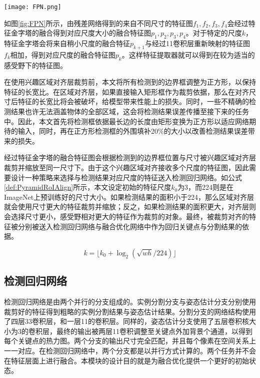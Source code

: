 \begin{figure*}[htbp]	
	\centering
	\texttt{[image: FPN.png]}
	\caption{特征金字塔结构：左侧为特征金字塔中特征融合的方式；右侧为融合结构设计。}
	\label{fig:FPN}
\end{figure*}

如图\ref{fig:FPN}所示，由残差网络得到的来自不同尺寸的特征图$f_1, f_2, f_3, f_4$会经过特征金字塔的融合得到对应尺度大小的融合特征图$p_1, p_2, p_3, p_4$。对于特定的尺度$k$，特征金字塔会将来自稍小尺度的融合特征$p_{k+1}$与经过1\times1卷积层重新映射的特征图$f_k$相加，得到对应尺度的融合特征图$p_k$。这样特征提取器就可以得到在较为适当的感受野下的特征图。

在使用兴趣区域对齐层裁剪前，本文将所有检测到的边界框调整为正方形，以保持特征的长宽比。在区域对齐层，如果直接输入矩形框作为裁剪依据，那么在对齐尺寸后特征的长宽比将会被破坏，给模型带来性能上的损失。同时，一些不精确的检测结果也许无法涵盖物体的全部区域，这会将检测结果误差传播至接下来的任务中。因此，本文首先将检测框依据最长边的长度由矩形变换为正方形以适应网络期待的输入，同时，再在正方形检测框的外围填补20\%的大小以改善检测结果误差带来的损失。

经过特征金字塔的融合特征图会根据检测到的边界框位置与尺寸被兴趣区域对齐层裁剪并缩放至同一尺寸下。由于这个兴趣区域对齐接收多个尺度的特征图，因此需要设计一种策略来选择与检测结果对应尺度的特征送入检测回归网络。如公式\eqref{def:PyramidRoIAlign}所示，本文设定初始的特征尺度$k_0$为3，而224则是在ImageNet上预训练好的尺寸大小。如果检测结果的面积小于224，那么区域对齐层就会使用尺寸更大的特征裁剪并缩放；反之，如果检测结果的面积更大，对齐层则会选择尺寸更小，感受野相对更大的特征作为裁剪的对象。最终，被裁剪对齐的特征被分别被送入检测回归网络与融合优化网络中作为回归关键点与分割结果的依据。

\begin{equation}
\label{def:PyramidRoIAlign}
k =\lfloor k_0 + \log_{2}(\sqrt{wh} / 224) \rfloor
\end{equation}

\subsection{检测回归网络}
\label{subsec:detection}
检测回归网络是由两个并行的分支组成的。实例分割分支与姿态估计分支分别使用裁剪好的特征得到粗略的实例分割结果与姿态估计结果。分割分支的网络结构使用了四层3\times3卷积层，和一层1\times1的卷积层。同样的，姿态估计分支使用了五层卷积核大小为3的卷积层，最终的输出被两层1\times1卷积调整至关键点外加背景个通道，以得到每个关键点的热力图。两个分支的输出尺寸完全匹配，并且每个像素在空间关系上一一对应。在检测回归网络中，两个分支都是以并行方式计算的。两个任务并不会在特征层面上进行融合。本模块的设计目的就是为融合优化提供一个更好的初始状态。

